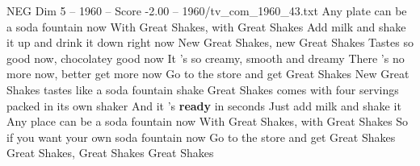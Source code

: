 \begin{textsample}{NEG Dim 5 – 1960 – Score -2.00 – 1960/tv\_com\_1960\_43.txt}  \label{ex:f5_neg_016}
Any plate can be a soda fountain now With Great Shakes, with Great Shakes Add milk and shake it up and drink it down right now New Great Shakes, new Great Shakes Tastes so good now, chocolatey good now It 's so creamy, smooth and dreamy There 's no more now, better get more now Go to the store and get Great Shakes New Great Shakes tastes like a soda fountain shake Great Shakes comes with four servings packed in its own shaker And it 's \textbf{ready} in seconds Just add milk and shake it Any place can be a soda fountain now With Great Shakes, with Great Shakes So if you want your own soda fountain now Go to the store and get Great Shakes Great Shakes, Great Shakes Great Shakes

\end{textsample}
